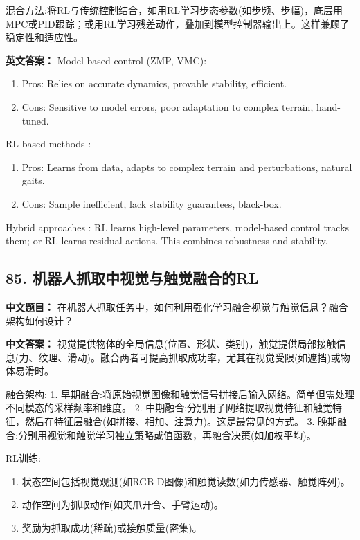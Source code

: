 \documentclass[10pt,a4paper]{ctexart}
\begin{document}
 混合方法:将RL与传统控制结合，如用RL学习步态参数(如步频、步幅)，底层用MPC或PID跟踪；或用RL学习残差动作，叠加到模型控制器输出上。这样兼顾了稳定性和适应性。

\textbf{英文答案：}  
 Model-based control  (ZMP, VMC):
\begin{enumerate}
    \item Pros: Relies on accurate dynamics, provable stability, efficient.
    \item Cons: Sensitive to model errors, poor adaptation to complex terrain, hand-tuned.
\end{enumerate}

 RL-based methods :
\begin{enumerate}
    \item Pros: Learns from data, adapts to complex terrain and perturbations, natural gaits.
    \item Cons: Sample inefficient, lack stability guarantees, black-box.
\end{enumerate}

 Hybrid approaches : RL learns high-level parameters, model-based control tracks them; or RL learns residual actions. This combines robustness and stability.

\subsection*{85. 机器人抓取中视觉与触觉融合的RL}
\textbf{中文题目：} 在机器人抓取任务中，如何利用强化学习融合视觉与触觉信息？融合架构如何设计？

\textbf{中文答案：}  
视觉提供物体的全局信息(位置、形状、类别)，触觉提供局部接触信息(力、纹理、滑动)。融合两者可提高抓取成功率，尤其在视觉受限(如遮挡)或物体易滑时。

 融合架构:
1.  早期融合:将原始视觉图像和触觉信号拼接后输入网络。简单但需处理不同模态的采样频率和维度。
2.  中期融合:分别用子网络提取视觉特征和触觉特征，然后在特征层融合(如拼接、相加、注意力)。这是最常见的方式。
3.  晚期融合:分别用视觉和触觉学习独立策略或值函数，再融合决策(如加权平均)。

 RL训练:
\begin{enumerate}
    \item 状态空间包括视觉观测(如RGB-D图像)和触觉读数(如力传感器、触觉阵列)。
    \item 动作空间为抓取动作(如夹爪开合、手臂运动)。
    \item 奖励为抓取成功(稀疏)或接触质量(密集)。
\end{enumerate}
\end{document}
